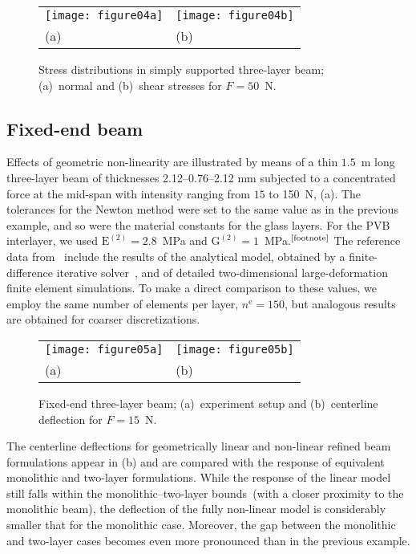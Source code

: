 \documentclass[11pt]{article}
\newcommand{\rev}[1]{#1}
\newcommand{\lay}[1]{^{(#1)}}
\newcommand{\E}[1]{\mathrm{E}\lay{#1}}\newcommand{\G}[1]{\mathrm{G}\lay{#1}}\newcommand{\A}[1]{A\lay{#1}}\newcommand{\I}[1]{I\lay{#1}}\newcommand{\As}[1]{A_\mathrm{s}\lay{#1}}
\newcommand{\el}{e}
\newcommand{\numel}{n^\mathrm{\el}}
\begin{document}
\begin{figure}[h]
\begin{tabular}{ll}
\texttt{[image: figure04a]} & 
\texttt{[image: figure04b]} \\[-2mm]
(a) & (b)
\end{tabular}
\caption{\rev{Stress distributions in simply supported three-layer beam;
(a)~normal and (b)~shear stresses for $F=50$~N.}}
\label{fig:stress_distrib_simple}
\end{figure}

\subsection{Fixed-end beam}\label{sec:fixed_end}

Effects of geometric non-linearity are illustrated by means of a thin $1.5$~m
long three-layer beam of thicknesses 2.12--0.76--2.12 mm subjected to a
concentrated force at the mid-span with intensity ranging from $15$ to 150~N,
\rev{}(a). The tolerances for the Newton method were set to
the same value as in the previous example, and so were the material constants for
the glass layers. For the PVB interlayer, we used $\E{2} = 2.8$~MPa and $\G{2} =
1$~MPa.$^\text{\ref{footnote}}$ The reference data from~\cite{Asik:2005:MMB}
include the results of the analytical model, obtained by a finite-difference iterative
solver~\cite{Asik:2003:LGP}, and of detailed two-dimensional large-deformation
finite element simulations. To make a direct comparison to these values, we
employ the same number of elements per layer, $\numel = 150$, but analogous
results are obtained for coarser discretizations.

\begin{figure}[h]
\begin{tabular}{ll}
\texttt{[image: figure05a]} & 
\texttt{[image: figure05b]} \\[-2mm]
(a) & (b)
\end{tabular}
\caption{Fixed-end three-layer beam; (a)~experiment setup and
(b)~centerline deflection for $F = 15$~N.}
\label{fig:fe_setup}
\end{figure}

The centerline deflections for geometrically linear and non-linear refined beam
formulations appear in \rev{}(b) and are compared with the
response of equivalent monolithic and two-layer formulations. While the response of the
linear model still falls within the monolithic--two-layer bounds~(with a
closer proximity to the monolithic beam), the deflection of the fully non-linear model
is considerably smaller that for the monolithic case. Moreover, the gap between the
monolithic and two-layer cases becomes even more pronounced than in the
previous example.
\end{document}
